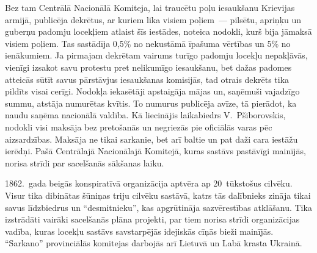 \documentclass[twoside,a5paper,12pt,fleqn,openany]{extbook}
\begin{document}
Bez tam Centrālā Nacionālā Komiteja, lai traucētu poļu iesaukšanu Krievijas armijā, publicēja dekrētus, ar kuriem lika visiem poļiem~--- pilsētu, apriņķu un guberņu padomju locekļiem atlaist šīs iestādes, noteica nodokli, kurš bija jāmaksā visiem poļiem. Tas sastādīja 0,5\% no nekustāmā īpašuma vērtības un 5\% no ienākumiem. Ja pirmajam dekrētam vairums turīgo padomju locekļu nepakļāvās, vienīgi izsakot savu protestu pret nelikumīgo iesaukšanu, bet dažas padomes atteicās sūtīt savus pārstāvjus iesaukšanas komisijās, tad otrais dekrēts tika pildīts visai cerīgi. Nodokļa iekasētāji apstaigāja mājas un, saņēmuši vajadzīgo summu, atstāja numurētas kvītis. To numurus publicēja avīze, tā pierādot, ka naudu saņēma nacionālā valdība. Kā liecinājis laikabiedrs V.~Pšiborovskis, nodokli visi maksāja bez pretošanās un negriezās pie oficiālās varas pēc aizsardzības. Maksāja ne tikai sarkanie, bet arī baltie un pat daži cara iestāžu ierēdņi. Pašā Centrālajā Nacionālajā Komitejā, kuras sastāvs pastāvīgi mainījās, norisa strīdi par sacelšanās sākšanas laiku.

1862.~gada beigās konspiratīvā organizācija aptvēra ap 20~tūkstošus cilvēku. Visur tika dibinātas šūniņas triju cilvēku sastāvā, katrs tās dalībnieks zināja tikai savus līdzbiedrus un ``desmitnieku'', kas apgrūtināja sazvērestības atklāšanu. Tika izstrādāti vairāki sacelšanās plāna projekti, par tiem norisa strīdi organizācijas vadība, kuras locekļu sastāvs savstarpējās idejiskās cīņās bieži mainījās. ``Sarkano'' provinciālās komitejas darbojās arī Lietuvā un Labā krasta Ukrainā.
\end{document}
